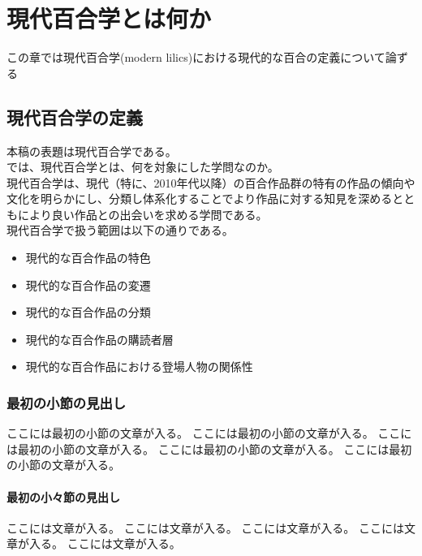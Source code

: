 \documentclass[ %
	uplatex,%
	a5paper,%
	papersize%
	]{jsbook}
\begin{document}
	\tableofcontents %

	\mainmatter

	\chapter{現代百合学とは何か}

	\begin{summary}
		この章では現代百合学(modern lilics)における現代的な百合の定義について論ずる
	\end{summary}

	\section{現代百合学の定義}
	本稿の表題は現代百合学である。\\
	では、現代百合学とは、何を対象にした学問なのか。\\
	
	現代百合学は、現代（特に、2010年代以降）の百合作品群の特有の作品の傾向や文化を明らかにし、分類し体系化することでより作品に対する知見を深めるとともにより良い作品との出会いを求める学問である。\\
	
	現代百合学で扱う範囲は以下の通りである。

	\begin{itemize}
		\item 現代的な百合作品の特色
		\item 現代的な百合作品の変遷
		\item 現代的な百合作品の分類
		\item 現代的な百合作品の購読者層
		\item 現代的な百合作品における登場人物の関係性
	\end{itemize}

	\subsection{最初の小節の見出し}

	ここには最初の小節の文章が入る。
	ここには最初の小節の文章が入る。
	ここには最初の小節の文章が入る。
	ここには最初の小節の文章が入る。
	ここには最初の小節の文章が入る。

	\subsubsection{最初の小々節の見出し}

	ここには文章が入る。
	ここには文章が入る。
	ここには文章が入る。
	ここには文章が入る。
	ここには文章が入る。
\end{document}
